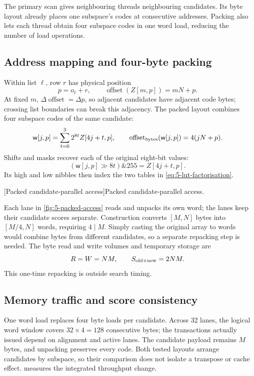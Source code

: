 The primary scan gives neighbouring threads neighbouring candidates.
Its byte layout already places one subspace's codes at consecutive
addresses. Packing also lets each thread obtain four subspace codes in
one word load, reducing the number of load operations.

\subsection{Address mapping and four-byte packing}

Within list $\ell$, row $r$ has physical position
\[
 p=o_\ell+r,\qquad \operatorname{offset}(Z[m,p])=mN+p.
\]
At fixed $m$, $\Delta\operatorname{offset}=\Delta p$, so adjacent
candidates have adjacent code bytes; crossing list boundaries can break
this adjacency. The packed layout combines four subspace codes of the
same candidate:
\begin{equation}
 \mathsf{w}[j,p]=\sum_{t=0}^{3}2^{8t}Z[4j+t,p],\qquad
 \operatorname{offset}_{\rm bytes}(\mathsf{w}[j,p])=4(jN+p).
 \label{eq:5-packed-layout}
\end{equation}
Shifts and masks recover each of the original eight-bit values:
\[
 (\mathsf w[j,p]\gg8t)\mathbin{\&}255=Z[4j+t,p].
\]
Its high and low nibbles then index the two tables in
\cref{eq:5-lut-factorisation}.

\par\medskip\noindent\begin{minipage}{\linewidth}
\captionsetup{hypcap=false}
\centering

[Packed candidate-parallel access]{Packed candidate-parallel access.}
\label{fig:5-packed-access}
\end{minipage}\par\medskip
Each lane in \cref{fig:5-packed-access} reads and unpacks its own word;
the lanes keep their candidate scores separate. Construction converts
$[M,N]$ bytes into $[M/4,N]$ words, requiring $4\mid M$. Simply casting
the original array to words would combine bytes from different
candidates, so a separate repacking step is needed. The byte read and
write volumes and temporary storage are
\[
 R=W=NM,\qquad S_{\rm old+new}=2NM.
\]
This one-time repacking is outside search timing.

\subsection{Memory traffic and score consistency}

One word load replaces four byte loads per candidate. Across 32 lanes,
the logical word window covers $32\times4=128$ consecutive bytes;
the transactions actually issued depend on alignment and active lanes.
The candidate payload remains $M$ bytes, and unpacking preserves every
code. Both tested layouts arrange candidates by subspace, so their
comparison does not isolate a transpose or cache effect. 
measures the integrated throughput change.
